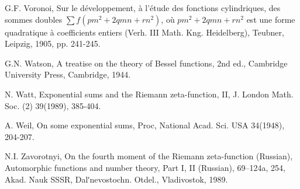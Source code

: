 \begin{thebibliography}{99}
 G.F. Voronoi, Sur le d\'eveloppement, \`a l'\'etude des fonctions cylindriques, des sommes doubles $\sum f (pm^2 + 2 q mn + rn^2)$, o\`u $pm^2 + 2 q mn + rn^2$ est une forme quadratique \`a coefficients entiers (Verh. III Math. Kng. Heidelberg), Teubner, Leipzig, 1905, pp. 241-245.

 G.N. Watson, A treatise on the theory of Bessel functions, 2nd ed., Cambridge University Press, Cambridge, 1944.

 N. Watt, Exponential sums and the Riemann zeta-function, II, J. London Math. Soc. (2) 39(1989), 385-404.

 A. Weil, On some exponential sums, Proc, National Acad. Sci. USA 34(1948), 204-207.

 N.I. Zavorotnyi, On the fourth moment of the Riemann zeta-function (Russian), Automorphic functions and number theory, Part I, II (Russian), 69--124a, 254, Akad. Nauk SSSR, Dalʹnevostochn. Otdel., Vladivostok, 1989.

\end{thebibliography}
